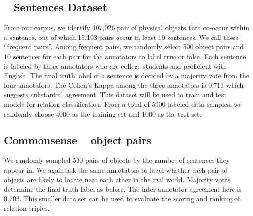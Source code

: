 \subsection{\lnear~ Sentences Dataset}
\label{lsd}
From our corpus, we identify 107,026 pair of physical objects that
co-occur within a sentence, out of which 
15,193 pairs occur in least 10 sentences.
We call these ``frequent pairs''.
Among frequent pairs, we randomly select 500 object pairs and 
10 sentences for each pair for the annotators to label true or false. 
Each sentence is labeled by three annotators who are college students
and proficient with English. The final truth label of a sentence is decided
by a majority vote from the four annotators. 
The Cohen's Kappa among the three annotators is 0.711 which suggests
substantial agreement. 
This dataset will be used to train and test models for relation
classification.
From a total of 5000 labeled data samples, 
we randomly choose 4000 as the training set and 1000 as the test set.


\subsection{Commonsense \lnear~ object pairs}
We randomly sampled 500 pairs of objects by the number of sentences they
appear in. 
We again ask the same annotators to label whether each pair of objects
are likely to locate near each other in the real world. 
Majority votes determine the final truth label as before.
The inter-annotator agreement here is {0.703}. 
This smaller data set can be used to evaluate the 
scoring and ranking of relation triples. 
